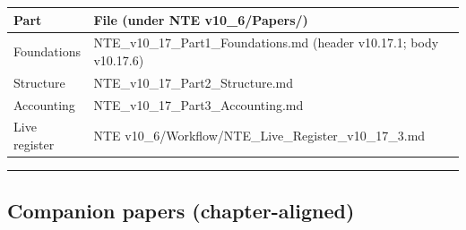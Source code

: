 \documentclass[
  11pt,
]{article}
\newcounter{none} %
\begin{document}
{\def\LTcaptype{none} %
\begin{longtable}[]{@{}
  >{\raggedright\arraybackslash}p{}
  >{\raggedright\arraybackslash}p{}@{}}
\toprule\noalign{}
\begin{minipage}[b]{\linewidth}\raggedright
Part
\end{minipage} & \begin{minipage}[b]{\linewidth}\raggedright
File (under NTE v10\_\allowbreak{}6/\allowbreak{}Papers/\allowbreak{})
\end{minipage} \\
\midrule\noalign{}
\endhead
\bottomrule\noalign{}
\endlastfoot
Foundations &
NTE\_\allowbreak{}v10\_\allowbreak{}17\_\allowbreak{}Part1\_\allowbreak{}Foundations.md
(header v10.17.1; body v10.17.6) \\
Structure &
NTE\_\allowbreak{}v10\_\allowbreak{}17\_\allowbreak{}Part2\_\allowbreak{}Structure.md \\
Accounting &
NTE\_\allowbreak{}v10\_\allowbreak{}17\_\allowbreak{}Part3\_\allowbreak{}Accounting.md \\
Live register & NTE
v10\_\allowbreak{}6/\allowbreak{}Workflow/\allowbreak{}NTE\_\allowbreak{}Live\_\allowbreak{}Register\_\allowbreak{}v10\_\allowbreak{}17\_\allowbreak{}3.md \\
\end{longtable}
}

\begin{center}\rule{0.5\linewidth}{0.5pt}\end{center}

\subsection{Companion papers
(chapter-aligned)}\label{companion-papers-chapter-aligned}
\end{document}
